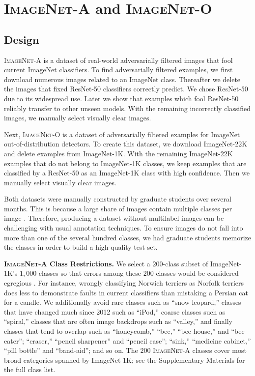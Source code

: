 \documentclass[10pt,twocolumn,letterpaper]{article}
\begin{document}
\section{\textsc{ImageNet-A} and \textsc{ImageNet-O}}\label{sec:design}
\subsection{Design}
\textsc{ImageNet-A} is a dataset of real-world adversarially filtered images that fool current ImageNet classifiers.
To find adversarially filtered examples, we first download numerous images related to an ImageNet class. Thereafter we delete the images that fixed ResNet-50 \cite{resnet} classifiers correctly predict. We chose ResNet-50 due to its widespread use. Later we show that examples which fool ResNet-50 reliably transfer to other unseen models. With the remaining incorrectly classified images, we manually select visually clear images.

Next, \textsc{ImageNet-O} is a dataset of adversarially filtered examples for ImageNet out-of-distribution detectors. To create this dataset, we download ImageNet-22K and delete examples from ImageNet-1K. With the remaining ImageNet-22K examples that do not belong to ImageNet-1K classes, we keep examples that are classified by a ResNet-50 as an ImageNet-1K class with high confidence. Then we manually select visually clear images.

Both datasets were manually constructed by graduate students over several months. This is because a large share of images contain multiple classes per image \cite{Stock2018ConvNetsAI}. Therefore, producing a dataset without multilabel images can be challenging with usual annotation techniques. To ensure images do not fall into more than one of the several hundred classes, we had graduate students memorize the classes in order to build a high-quality test set.

\noindent\textbf{\textsc{ImageNet-A} Class Restrictions.}\quad 
We select a $200$-class subset of ImageNet-1K's $1,000$ classes so that errors among these $200$ classes would be considered egregious \cite{imagenet}.
For instance, wrongly classifying Norwich terriers as Norfolk terriers does less to demonstrate faults in current classifiers than mistaking a Persian cat for a candle.
We additionally avoid rare classes such as ``snow leopard,'' classes that have changed much since 2012 such as ``iPod,'' coarse classes such as ``spiral,'' classes that are often image backdrops such as ``valley,'' and finally classes that tend to overlap such as ``honeycomb,'' ``bee,'' ``bee house,'' and ``bee eater''; ``eraser,'' ``pencil sharpener'' and ``pencil case''; ``sink,'' ``medicine cabinet,'' ``pill bottle'' and ``band-aid''; and so on. The $200$ \textsc{ImageNet-A} classes cover most broad categories spanned by ImageNet-1K; see the Supplementary Materials  for the full class list.
\end{document}
